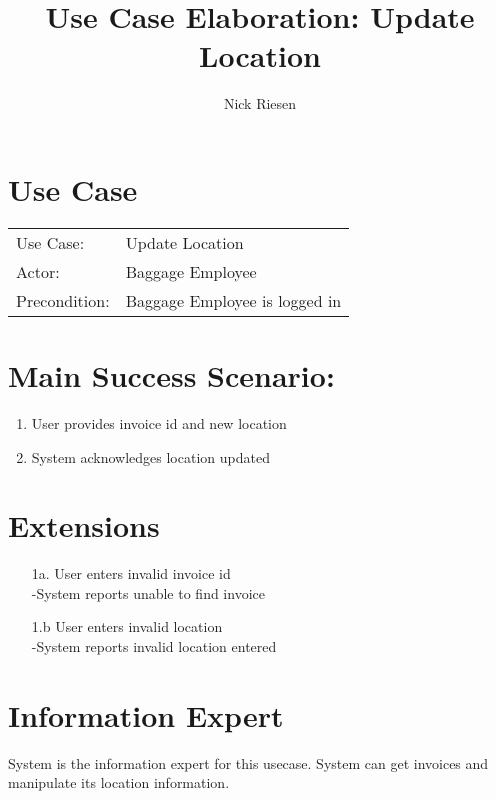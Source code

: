 \documentclass{article}
\title{Use Case Elaboration: Update Location}
\author{ Nick Riesen }
\begin{document}
\maketitle


\section*{Use Case}
\begin{tabular}{l l}
Use Case:     & Update Location               \\
Actor:        & Baggage Employee              \\
Precondition: & Baggage Employee is logged in \\
\end{tabular}


\section*{Main Success Scenario:}

\begin{enumerate}
    \item  User provides invoice id and new location 
    \item System acknowledges location updated

\end{enumerate}

\section*{Extensions}

\begin{itemize}
    \item [1a.] User enters invalid invoice id \\
        -System reports unable to find invoice
             
    \item [1.b] User enters invalid location \\  
        -System reports invalid location entered
        
\end{itemize}

\section*{Information Expert}

System is the information expert for this usecase. System can get invoices and manipulate its location information.
\end{document}
